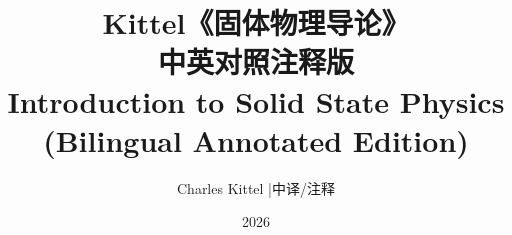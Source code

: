 \pagestyle{fancy}
\fancyhf{}
\fancyhead[R]{\small\sffamily\leftmark}
\fancyfoot[C]{\small\thepage}
\renewcommand{\headrulewidth}{0.3pt}
\renewcommand{\footrulewidth}{0pt}

\newenvironment{enpara}%
  {\par\smallskip\begingroup\color{enColor}\setstretch{1.05}\noindent}%
  {\par\endgroup\smallskip}
\newenvironment{zhpara}%
  {\par\begingroup\color{zhColor}\setstretch{1.35}\noindent}%
  {\par\endgroup\medskip}

\newcommand{\term}[2]{\textcolor{termColor}{\textbf{#1}}%
  \footnote{\textcolor{termColor}{\textbf{#1}}：\kai #2}}

\newcommand{\figcap}[2]{\par{\small\color{capColor}\noindent #1}\par
  {\footnotesize\color{capColor}\noindent\itshape #2}\par\smallskip}

\newcommand{\pairrule}{\par\vspace{0.1em}{\color{ruleColor}\hrule height 0.4pt}\vspace{0.2em}}

\newcommand{\chname}[2]{\chapter{#2}\chaptermark{#2}}

\title{\Huge Kittel《固体物理导论》\\[6pt]\Large 中英对照注释版\\[4pt]\large Introduction to Solid State Physics (Bilingual Annotated Edition)}
\author{Charles Kittel \quad|\quad 中译/注释}
\date{2026}
